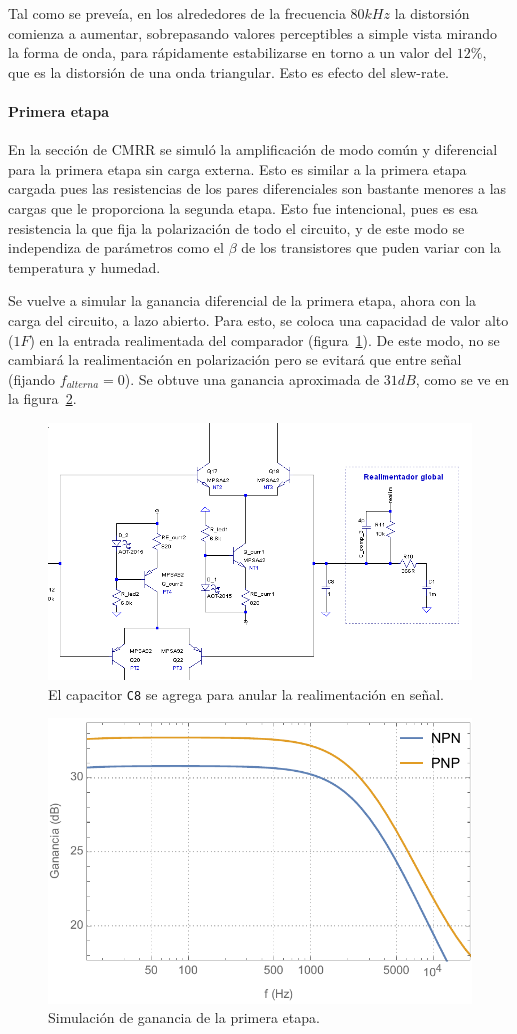 \documentclass[a4paper,12pt,twoside]{article}
\begin{document}
Tal como se preveía, en los alrededores de la frecuencia $80kHz$ la distorsión comienza a aumentar, sobrepasando valores perceptibles a simple vista mirando la forma de onda, para rápidamente estabilizarse en torno a un valor del $12\%$, que es la distorsión de una onda triangular. Esto es efecto del slew-rate.


\paragraph{Primera etapa}

En la sección de CMRR se simuló la amplificación de modo común y diferencial para la primera etapa sin carga externa. Esto es similar a la primera etapa cargada pues las resistencias de los pares diferenciales son bastante menores a las cargas que le proporciona la segunda etapa. Esto fue intencional, pues es esa resistencia la que fija la polarización de todo el circuito, y de este modo se independiza de parámetros como el $\beta$ de los transistores que puden variar con la temperatura y humedad.

Se vuelve a simular la ganancia diferencial de la primera etapa, ahora con la carga del circuito, a lazo abierto. Para esto, se coloca una capacidad de valor alto ($1F$) en la entrada realimentada del comparador (figura~\ref{fig:ala}). De este modo, no se cambiará la realimentación en polarización pero se evitará que entre señal (fijando $f_{alterna}=0$). Se obtuve una ganancia aproximada de $31dB$, como se ve en la figura~\ref{fig:1era-etapa-bode}.

\begin{figure}[H]
	\centering
	\includegraphics[height=0.4\textwidth]{img/sim/ala}
	\caption{El capacitor \texttt{C8} se agrega para anular la realimentación en señal.}
	\label{fig:ala}
\end{figure}


\begin{figure}[H]
	\centering
	\includegraphics[height=0.4\textwidth]{img/sim/1era-etapa-bode}
	\caption{Simulación de ganancia de la primera etapa.}
	\label{fig:1era-etapa-bode}
\end{figure}
\end{document}

